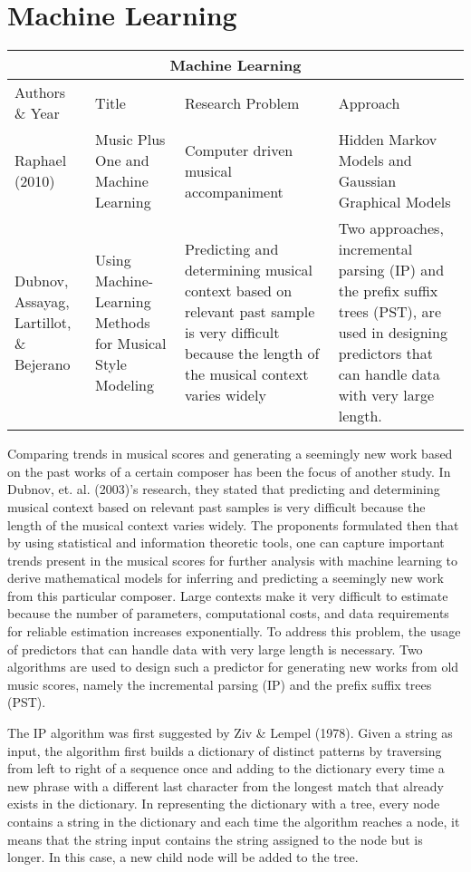 \section{Machine Learning}

\begin{center}
\begin{tabular}{ |p{3cm}|p{3cm}|p{3cm}|p{3cm}| }
 \hline
 \multicolumn{4}{|c|}{Machine Learning} \\
 \hline
 Authors \& Year&Title&Research Problem&Approach\\
 \hline
 Raphael (2010)& Music Plus One and Machine Learning & Computer driven musical accompaniment &Hidden Markov Models and Gaussian Graphical Models\\
\hline
Dubnov, Assayag, Lartillot, \& Bejerano& Using Machine-Learning Methods for Musical Style Modeling& Predicting and determining musical context based on relevant past sample is very difficult because the length of the musical context varies widely & Two approaches, incremental parsing (IP) and the prefix suffix trees (PST), are used in designing predictors that can handle data with very large length.\\
\hline
\end{tabular}
\end{center}

Comparing trends in musical scores and generating a seemingly new work based on the past works of a certain composer has been the focus of another study. In Dubnov, et. al. (2003)'s research, they stated that predicting and determining musical context based on relevant past samples is very difficult because the length of the musical context varies widely. The proponents formulated then that by using statistical and information theoretic tools, one can capture important trends present in the musical scores for further analysis with machine learning to derive mathematical models for inferring and predicting a seemingly new work from this particular composer. Large contexts make it very difficult to estimate because the number of parameters, computational costs, and data requirements for reliable estimation increases exponentially. To address this problem, the usage of predictors that can handle data with very large length is necessary. Two algorithms are used to design such a predictor for generating new works from old music scores, namely the incremental parsing (IP) and the prefix suffix trees (PST).
 
The IP algorithm was first suggested by Ziv \& Lempel (1978). Given a string as input, the algorithm first builds a dictionary of distinct patterns by traversing from left to right of a sequence once and adding to the dictionary every time a new phrase with a different last character from the longest match that already exists in the dictionary. In representing the dictionary with a tree, every node contains a string in the dictionary and each time the algorithm reaches a node, it means that the string input contains the string assigned to the node but is longer. In this case, a new child node will be added to the tree.

